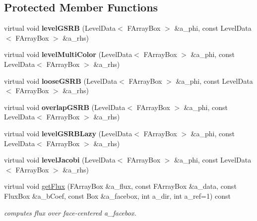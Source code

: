 \subsection*{Protected Member Functions}
\begin{DoxyCompactItemize}
\item 
\hypertarget{class_a_m_r_liquid_conc_op_a91131e715731bb362a03513a0e9d89df}{virtual void {\bfseries level\-G\-S\-R\-B} (Level\-Data$<$ F\-Array\-Box $>$ \&a\-\_\-phi, const Level\-Data$<$ F\-Array\-Box $>$ \&a\-\_\-rhs)}\label{class_a_m_r_liquid_conc_op_a91131e715731bb362a03513a0e9d89df}

\item 
\hypertarget{class_a_m_r_liquid_conc_op_ac7906ac7e579a32b262cc4a3beaa7173}{virtual void {\bfseries level\-Multi\-Color} (Level\-Data$<$ F\-Array\-Box $>$ \&a\-\_\-phi, const Level\-Data$<$ F\-Array\-Box $>$ \&a\-\_\-rhs)}\label{class_a_m_r_liquid_conc_op_ac7906ac7e579a32b262cc4a3beaa7173}

\item 
\hypertarget{class_a_m_r_liquid_conc_op_ade7c1f979fb397e5b7b962bd88326770}{virtual void {\bfseries loose\-G\-S\-R\-B} (Level\-Data$<$ F\-Array\-Box $>$ \&a\-\_\-phi, const Level\-Data$<$ F\-Array\-Box $>$ \&a\-\_\-rhs)}\label{class_a_m_r_liquid_conc_op_ade7c1f979fb397e5b7b962bd88326770}

\item 
\hypertarget{class_a_m_r_liquid_conc_op_a67a148d50642ea340f5c255528d8f438}{virtual void {\bfseries overlap\-G\-S\-R\-B} (Level\-Data$<$ F\-Array\-Box $>$ \&a\-\_\-phi, const Level\-Data$<$ F\-Array\-Box $>$ \&a\-\_\-rhs)}\label{class_a_m_r_liquid_conc_op_a67a148d50642ea340f5c255528d8f438}

\item 
\hypertarget{class_a_m_r_liquid_conc_op_af7ed700550577c7c00f68e586df148f8}{virtual void {\bfseries level\-G\-S\-R\-B\-Lazy} (Level\-Data$<$ F\-Array\-Box $>$ \&a\-\_\-phi, const Level\-Data$<$ F\-Array\-Box $>$ \&a\-\_\-rhs)}\label{class_a_m_r_liquid_conc_op_af7ed700550577c7c00f68e586df148f8}

\item 
\hypertarget{class_a_m_r_liquid_conc_op_a4e2428929d6dda135ef656210b1fe2ff}{virtual void {\bfseries level\-Jacobi} (Level\-Data$<$ F\-Array\-Box $>$ \&a\-\_\-phi, const Level\-Data$<$ F\-Array\-Box $>$ \&a\-\_\-rhs)}\label{class_a_m_r_liquid_conc_op_a4e2428929d6dda135ef656210b1fe2ff}

\item 
\hypertarget{class_a_m_r_liquid_conc_op_a1e62604ca670fb59ead3855716dbbb7c}{virtual void \hyperlink{class_a_m_r_liquid_conc_op_a1e62604ca670fb59ead3855716dbbb7c}{get\-Flux} (F\-Array\-Box \&a\-\_\-flux, const F\-Array\-Box \&a\-\_\-data, const Flux\-Box \&a\-\_\-b\-Coef, const Box \&a\-\_\-facebox, int a\-\_\-dir, int a\-\_\-ref=1) const }\label{class_a_m_r_liquid_conc_op_a1e62604ca670fb59ead3855716dbbb7c}

\begin{DoxyCompactList}\small\item\em computes flux over face-\/centered a\-\_\-facebox. \end{DoxyCompactList}\end{DoxyCompactItemize}
